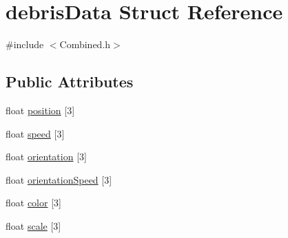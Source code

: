 \hypertarget{structdebrisData}{\section{debris\-Data Struct Reference}
\label{structdebrisData}
}


{\ttfamily \#include $<$Combined.\-h$>$}

\subsection*{Public Attributes}
\begin{DoxyCompactItemize}
\item 
float \hyperlink{structdebrisData_a83e759526fd3e37a970c37f11b3f8692}{position} \mbox{[}3\mbox{]}
\item 
float \hyperlink{structdebrisData_a979a15ead2fba9d83c4b9bc2c830c3ec}{speed} \mbox{[}3\mbox{]}
\item 
float \hyperlink{structdebrisData_a5dde6042df51e675f7e1c0314742914f}{orientation} \mbox{[}3\mbox{]}
\item 
float \hyperlink{structdebrisData_af8aedd6d89506857ad946bf9da4106fa}{orientation\-Speed} \mbox{[}3\mbox{]}
\item 
float \hyperlink{structdebrisData_a780787eca7eef881b736db2190cc641e}{color} \mbox{[}3\mbox{]}
\item 
float \hyperlink{structdebrisData_a1086fa18153e02ebe8b2514252befa02}{scale} \mbox{[}3\mbox{]}
\end{DoxyCompactItemize}


